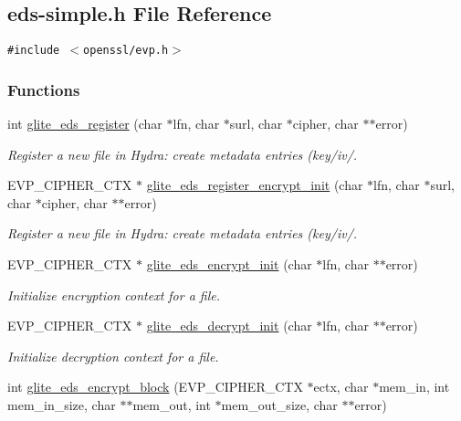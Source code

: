 \hypertarget{eds-simple_8h}{
\subsection{eds-simple.h File Reference}
\label{eds-simple_8h}
}
{\tt \#include $<$openssl/evp.h$>$}\par
\subsubsection*{Functions}
\begin{CompactItemize}
\item 
int \hyperlink{eds-simple_8h_a0}{glite\_\-eds\_\-register} (char $\ast$lfn, char $\ast$surl, char $\ast$cipher, char $\ast$$\ast$error)
\begin{CompactList}\small\item\em Register a new file in Hydra: create metadata entries (key/iv/. \item\end{CompactList}\item 
EVP\_\-CIPHER\_\-CTX $\ast$ \hyperlink{eds-simple_8h_a1}{glite\_\-eds\_\-register\_\-encrypt\_\-init} (char $\ast$lfn, char $\ast$surl, char $\ast$cipher, char $\ast$$\ast$error)
\begin{CompactList}\small\item\em Register a new file in Hydra: create metadata entries (key/iv/. \item\end{CompactList}\item 
EVP\_\-CIPHER\_\-CTX $\ast$ \hyperlink{eds-simple_8h_a2}{glite\_\-eds\_\-encrypt\_\-init} (char $\ast$lfn, char $\ast$$\ast$error)
\begin{CompactList}\small\item\em Initialize encryption context for a file. \item\end{CompactList}\item 
EVP\_\-CIPHER\_\-CTX $\ast$ \hyperlink{eds-simple_8h_a3}{glite\_\-eds\_\-decrypt\_\-init} (char $\ast$lfn, char $\ast$$\ast$error)
\begin{CompactList}\small\item\em Initialize decryption context for a file. \item\end{CompactList}\item 
int \hyperlink{eds-simple_8h_a4}{glite\_\-eds\_\-encrypt\_\-block} (EVP\_\-CIPHER\_\-CTX $\ast$ectx, char $\ast$mem\_\-in, int mem\_\-in\_\-size, char $\ast$$\ast$mem\_\-out, int $\ast$mem\_\-out\_\-size, char $\ast$$\ast$error)

\end{CompactItemize}

